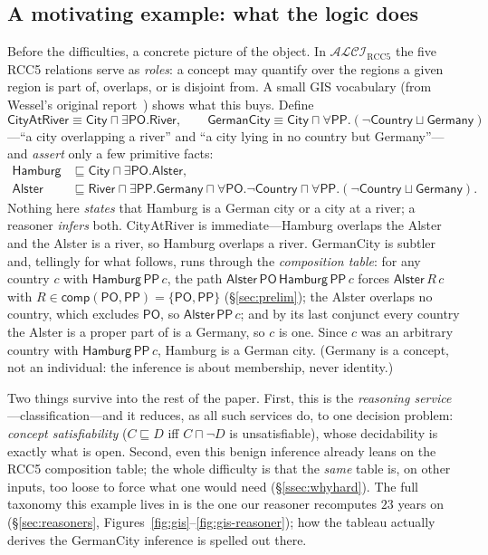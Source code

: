 \documentclass[11pt]{article}
\newcommand{\ALCIRCC}[1]{\mathcal{ALCI}_{\mathrm{RCC#1}}}
\newcommand{\PO}{\mathsf{PO}}
\newcommand{\PP}{\mathsf{PP}}
\newcommand{\comp}{\ensuremath{\mathsf{comp}}}
\theoremstyle{plain}
\theoremstyle{definition}
\begin{document}
\subsection{A motivating example: what the logic does}
\label{ssec:example}

Before the difficulties, a concrete picture of the object. In
$\ALCIRCC{5}$ the five RCC5 relations serve as \emph{roles}: a concept may
quantify over the regions a given region is part of, overlaps, or is
disjoint from. A small GIS vocabulary (from Wessel's original
report~\cite{Wessel2003}) shows what this buys. Define
\[
  \textsf{CityAtRiver} \equiv \textsf{City}\sqcap\exists\PO.\textsf{River},
  \qquad
  \textsf{GermanCity} \equiv
     \textsf{City}\sqcap\forall\PP.(\neg\textsf{Country}\sqcup\textsf{Germany})
\]
---``a city overlapping a river'' and ``a city lying in no country but
Germany''---and \emph{assert} only a few primitive facts:
\[
\begin{aligned}
  \textsf{Hamburg} &\sqsubseteq \textsf{City}\sqcap\exists\PO.\textsf{Alster},\\
  \textsf{Alster} &\sqsubseteq \textsf{River}\sqcap\exists\PP.\textsf{Germany}
    \sqcap\forall\PO.\neg\textsf{Country}
    \sqcap\forall\PP.(\neg\textsf{Country}\sqcup\textsf{Germany}).
\end{aligned}
\]
Nothing here \emph{states} that Hamburg is a German city or a city at a
river; a reasoner \emph{infers} both. \textsf{CityAtRiver} is
immediate---Hamburg overlaps the Alster and the Alster is a river, so
Hamburg overlaps a river. \textsf{GermanCity} is subtler and, tellingly for
what follows, runs through the \emph{composition table}: for any country
$c$ with $\textsf{Hamburg}\,\PP\,c$, the path
$\textsf{Alster}\,\PO\,\textsf{Hamburg}\,\PP\,c$ forces
$\textsf{Alster}\,R\,c$ with $R\in\comp(\PO,\PP)=\{\PO,\PP\}$
(\S\ref{sec:prelim}); the Alster overlaps no country, which excludes
$\PO$, so $\textsf{Alster}\,\PP\,c$; and by its last conjunct every
country the Alster is a proper part of is a \textsf{Germany}, so $c$ is one.
Since $c$ was an arbitrary country with $\textsf{Hamburg}\,\PP\,c$, Hamburg
is a German city. (\textsf{Germany} is a concept, not an individual: the
inference is about membership, never identity.)

Two things survive into the rest of the paper. First, this is the
\emph{reasoning service}---classification---and it reduces, as all such
services do, to one decision problem: \emph{concept satisfiability}
($C\sqsubseteq D$ iff $C\sqcap\neg D$ is unsatisfiable), whose decidability
is exactly what is open. Second, even this benign inference already leans
on the RCC5 composition table; the whole difficulty is that the \emph{same}
table is, on other inputs, too loose to force what one would need
(\S\ref{ssec:whyhard}). The full taxonomy this example lives in is the one
our reasoner recomputes $23$ years on (\S\ref{sec:reasoners},
Figures~\ref{fig:gis}--\ref{fig:gis-reasoner}); how the tableau actually
derives the \textsf{GermanCity} inference is spelled out there.
\end{document}
